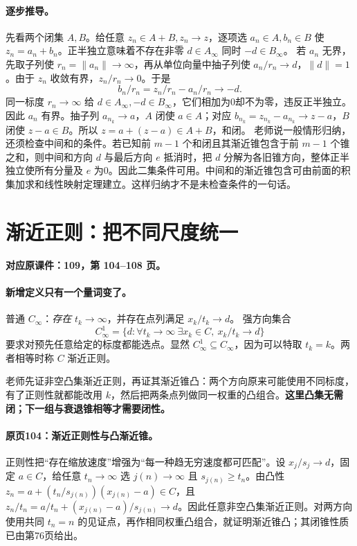 \paragraph{逐步推导。}
先看两个闭集 $A,B$。给任意 $z_n\in A+B,z_n\to z$，逐项选 $a_n\in A,b_n\in B$ 使 $z_n=a_n+b_n$。正半独立意味着不存在非零 $d\in A_\infty$ 同时 $-d\in B_\infty$。
若 $a_n$ 无界，先取子列使 $r_n=\|a_n\|\to\infty$，再从单位向量中抽子列使 $a_n/r_n\to d$，$\|d\|=1$。由于 $z_n$ 收敛有界，$z_n/r_n\to0$。于是
\[b_n/r_n=z_n/r_n-a_n/r_n\to-d.\]
同一标度 $r_n\to\infty$ 给 $d\in A_\infty,-d\in B_\infty$，它们相加为0却不为零，违反正半独立。因此 $a_n$ 有界。抽子列 $a_{n_k}\to a$，$A$ 闭使 $a\in A$；对应 $b_{n_k}=z_{n_k}-a_{n_k}\to z-a$，$B$ 闭使 $z-a\in B$。所以 $z=a+(z-a)\in A+B$，和闭。
老师说一般情形归纳，还须检查中间和的条件。若已知前 $m-1$ 个和闭且其渐近锥包含于前 $m-1$ 个锥之和，则中间和方向 $d$ 与最后方向 $e$ 抵消时，把 $d$ 分解为各旧锥方向，整体正半独立使所有分量及 $e$ 为0。因此二集条件可用。中间和的渐近锥包含可由前面的积集加求和线性映射定理建立。这样归纳才不是未检查条件的一句话。


\clearpage\section{渐近正则：把不同尺度统一}\label{g:109:104}

\textbf{对应原课件：109，第 104--108 页。}


\paragraph{新增定义只有一个量词变了。}
普通 $C_\infty$：\emph{存在} $t_k\to\infty$，并存在点列满足 $x_k/t_k\to d$。
强方向集合
\[C^1_\infty=\{d:\forall t_k\to\infty\ \exists x_k\in C,
\ x_k/t_k\to d\}
\]
要求对预先任意给定的标度都能选点。显然 $C^1_\infty\subseteq C_\infty$，因为可以特取 $t_k=k$。两者相等时称 $C$ 渐近正则。

老师先证非空凸集渐近正则，再证其渐近锥凸：两个方向原来可能使用不同标度，有了正则性就都能改用 $k$，然后把两条点列做同一权重的凸组合。\textbf{这里凸集无需闭；下一组与衰退锥相等才需要闭性。}


\paragraph{原页104：渐近正则性与凸渐近锥。}正则性把“存在缩放速度”增强为“每一种趋无穷速度都可匹配”。设 $x_j/s_j\to d$，固定 $a\in C$，给任意 $t_n\to\infty$ 选 $j(n)\to\infty$ 且 $s_{j(n)}\ge t_n$。由凸性 $z_n=a+(t_n/s_{j(n)})(x_{j(n)}-a)\in C$，且 $z_n/t_n=a/t_n+(x_{j(n)}-a)/s_{j(n)}\to d$。因此任意非空凸集渐近正则。对两方向使用共同 $t_n=n$ 的见证点，再作相同权重凸组合，就证明渐近锥凸；其闭锥性质已由第76页给出。



